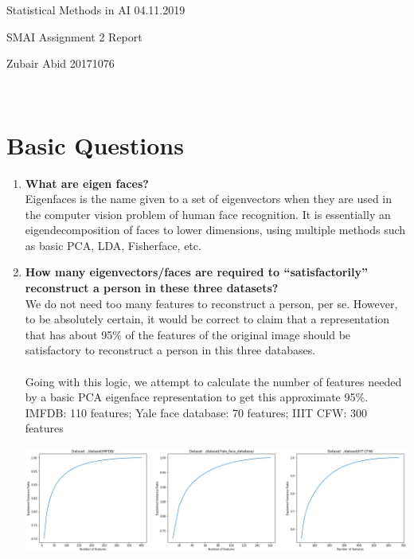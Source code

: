 \documentclass[10pt]{article}
\begin{document}
\begin{mdframed}

    Statistical Methods in AI 
    \hfill%
    04.11.2019


    \begin{center}
    \begin{LARGE}
        SMAI Assignment 2 Report
    \end{LARGE}
    \end{center}
    Zubair Abid
    \hfill
    20171076
\end{mdframed}	
$ $\\

\section{Basic Questions}
\begin{enumerate}
    \item \textbf{What are eigen faces?}\\
    Eigenfaces is the name given to a set of eigenvectors when they are used in the computer vision problem of human face recognition. It is essentially an eigendecomposition of faces to lower dimensions, using multiple methods such as basic PCA, LDA, Fisherface, etc.
    
    \item \textbf{How many eigenvectors/faces are required to “satisfactorily” reconstruct a  person  in  these  three  datasets?}\\
    We do not need too many features to reconstruct a person, per se. However, to be absolutely certain, it would be correct to claim that a representation that has about 95\% of the features of the original image should be satisfactory to reconstruct a person in this three databases.\\ 
$ $\\
Going with this logic, we attempt to calculate the number of features needed by a basic PCA eigenface representation to get this approximate 95\%. IMFDB: 110 features; Yale face database: 70 features; IIIT CFW: 300 features

    \includegraphics[scale=0.3]{./representation.png}
    

\end{enumerate}
\end{document}

